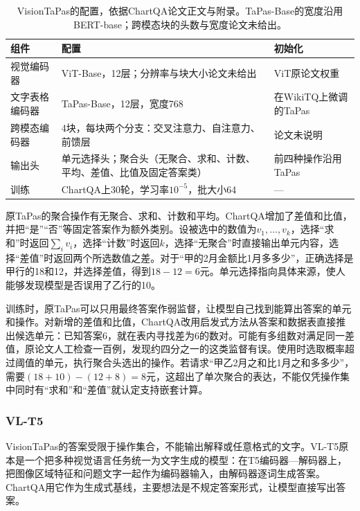 \begin{table}[htbp]
  \centering
  \small
  \begin{tabularx}{\linewidth}{@{}p{16mm}XX@{}}
    \toprule
    组件 & 配置 & 初始化\\
    \midrule
    视觉编码器 & ViT-Base，12层；分辨率与块大小论文未给出 & ViT原论文权重\\
    文字表格编码器 & TaPas-Base，12层，宽度768 & 在WikiTQ上微调的TaPas\\
    跨模态编码器 & 4块，每块两个分支：交叉注意力、自注意力、前馈层 & 论文未说明\\
    输出头 & 单元选择头；聚合头（无聚合、求和、计数、平均、差值、比值及固定答案类） & 前四种操作沿用TaPas\\
    训练 & ChartQA上30轮，学习率$10^{-5}$，批大小64 & —\\
    \bottomrule
  \end{tabularx}
  \caption{VisionTaPas的配置，依据ChartQA论文正文与附录。TaPas-Base的宽度沿用BERT-base；跨模态块的头数与宽度论文未给出。}
  \label{tab:vision-understanding-visiontapas-config}
\end{table}

原TaPas的聚合操作有无聚合、求和、计数和平均。ChartQA增加了差值和比值，并把“是”“否”等固定答案作为额外类别。设被选中的数值为$v_1,\ldots,v_k$，选择“求和”时返回$\sum_i v_i$，选择“计数”时返回$k$，选择“无聚合”时直接输出单元内容，选择“差值”时返回两个所选数值之差。对于“甲的2月金额比1月多多少”，正确选择是甲行的18和12，并选择差值，得到$18-12=6$元。单元选择指向具体来源，使人能够发现模型是否误用了乙行的10。

训练时，原TaPas可以只用最终答案作弱监督，让模型自己找到能算出答案的单元和操作。对新增的差值和比值，ChartQA改用启发式方法从答案和数据表直接推出候选单元：已知答案6，就在表内寻找差为6的数对。可能有多组数对满足同一差值，原论文人工检查一百例，发现约四分之一的这类监督有误。使用时选取概率超过阈值的单元，执行聚合头选出的操作。若请求“甲乙2月之和比1月之和多多少”，需要$(18+10)-(12+8)=8$元，这超出了单次聚合的表达，不能仅凭操作集中同时有“求和”和“差值”就认定支持嵌套计算。

\subsubsection{VL-T5}
\label{sec:vision-understanding-vlt5}

VisionTaPas的答案受限于操作集合，不能输出解释或任意格式的文字。VL-T5原本是一个把多种视觉语言任务统一为文字生成的模型：在T5编码器—解码器上，把图像区域特征和问题文字一起作为编码器输入，由解码器逐词生成答案。ChartQA用它作为生成式基线，主要想法是不规定答案形式，让模型直接写出答案。

